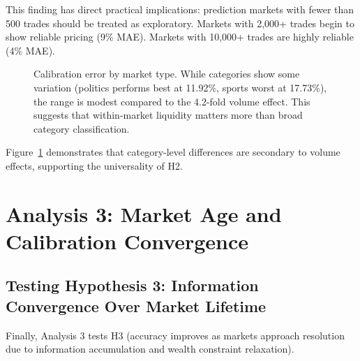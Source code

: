\documentclass[12pt,letterpaper]{article}
\begin{document}
This finding has direct practical implications: prediction markets with fewer than 500 trades should be treated as exploratory. Markets with 2,000+ trades begin to show reliable pricing (9\% MAE). Markets with 10,000+ trades are highly reliable (4\% MAE).

\begin{figure}[ht]
\centering
{}
\caption{Calibration error by market type. While categories show some variation (politics performs best at 11.92\%, sports worst at 17.73\%), the range is modest compared to the 4.2-fold volume effect. This suggests that within-market liquidity matters more than broad category classification.}
\label{fig:category-error}
\end{figure}

Figure~\ref{fig:category-error} demonstrates that category-level differences are secondary to volume effects, supporting the universality of H2.

\clearpage
\section{Analysis 3: Market Age and Calibration Convergence}\label{sec:analysis3}

\subsection{Testing Hypothesis 3: Information Convergence Over Market Lifetime}

Finally, Analysis 3 tests H3 (accuracy improves as markets approach resolution due to information accumulation and wealth constraint relaxation).
\end{document}
